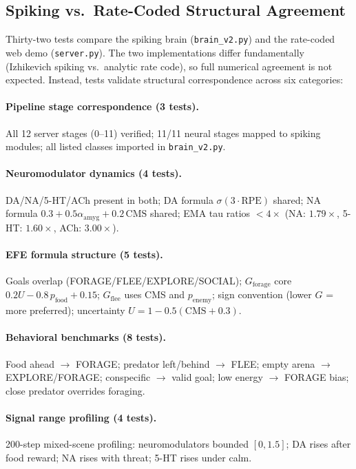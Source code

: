 \documentclass[11pt,a4paper]{article}
\begin{document}
\subsection{Spiking vs.\ Rate-Coded Structural Agreement}\label{sec:spiking_rate_tests}

Thirty-two tests compare the spiking brain (\texttt{brain\_v2.py})
and the rate-coded web demo (\texttt{server.py}). The two
implementations differ fundamentally (Izhikevich spiking vs.\ analytic
rate code), so full numerical agreement is not expected. Instead,
tests validate structural correspondence across six categories:

\paragraph{Pipeline stage correspondence (3 tests).}
All 12 server stages (0--11) verified; 11/11 neural stages mapped to
spiking modules; all listed classes imported in \texttt{brain\_v2.py}.

\paragraph{Neuromodulator dynamics (4 tests).}
DA/NA/5-HT/ACh present in both; DA formula $\sigma(3\cdot\text{RPE})$
shared; NA formula $0.3 + 0.5\alpha_\text{amyg} + 0.2\,\text{CMS}$
shared; EMA tau ratios $< 4\times$ (NA: $1.79\times$, 5-HT:
$1.60\times$, ACh: $3.00\times$).

\paragraph{EFE formula structure (5 tests).}
Goals overlap (FORAGE/FLEE/EXPLORE/SOCIAL); $G_\text{forage}$ core
$0.2U - 0.8\,p_\text{food} + 0.15$; $G_\text{flee}$ uses CMS and
$p_\text{enemy}$; sign convention (lower $G$ = more preferred);
uncertainty $U = 1 - 0.5(\text{CMS} + 0.3)$.

\paragraph{Behavioral benchmarks (8 tests).}
Food ahead $\to$ FORAGE; predator left/behind $\to$ FLEE; empty
arena $\to$ EXPLORE/FORAGE; conspecific $\to$ valid goal; low energy
$\to$ FORAGE bias; close predator overrides foraging.

\paragraph{Signal range profiling (4 tests).}
200-step mixed-scene profiling: neuromodulators bounded $[0, 1.5]$;
DA rises after food reward; NA rises with threat; 5-HT rises under
calm.
\end{document}
